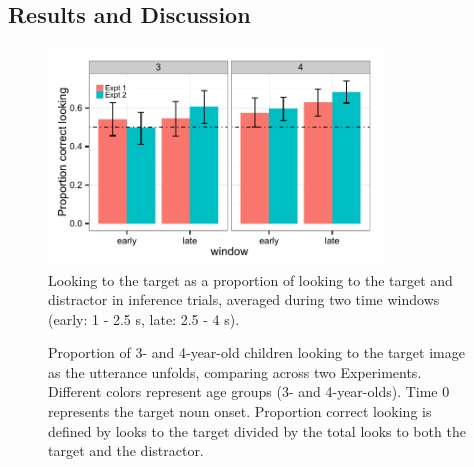 \documentclass[10pt,letterpaper]{article}
\begin{document}
\subsection{Results and Discussion}

\begin{figure}[t]
\begin{center} 
\includegraphics[width=3.5in]{figures/simpimp_pros-bar_inf.pdf}
\caption{\label{fig:0prosbar} Looking to the target as a proportion of looking to the target and distractor in inference trials, averaged during two time windows (early: 1 - 2.5 s,  late: 2.5 - 4 s).}
\end{center} 
\end{figure}

\begin{figure}[t]
	\caption{\label{fig:pros0} Proportion of 3- and 4-year-old children looking to the target image as the utterance unfolds, comparing across two Experiments. Different colors represent age groups (3- and 4-year-olds). Time 0 represents the target noun onset. Proportion correct looking is defined by looks to the target divided by the total looks to both the target and the distractor.}
\end{figure}
\end{document}
